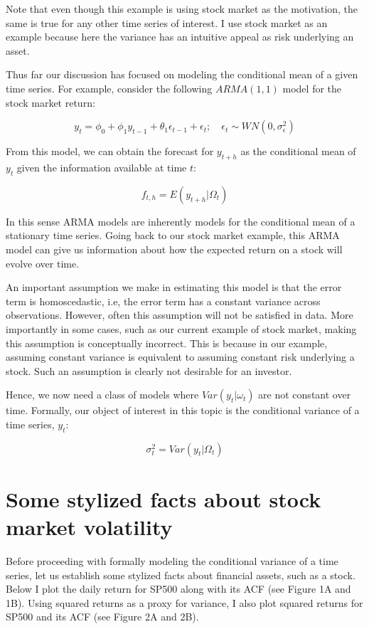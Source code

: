 \documentclass[]{book}
\theoremstyle{definition}
\theoremstyle{definition}
\theoremstyle{definition}
\theoremstyle{remark}
\begin{document}
Note that even though this example is using stock market as the motivation, the same is true for any other time series of interest. I use stock market as an example because here the variance has an intuitive appeal as risk underlying an asset.

Thus far our discussion has focused on modeling the conditional mean of a given time series. For example, consider the following \(ARMA(1,1)\) model for the stock market return:

\[y_t=\phi_0 + \phi_1 y_{t-1} + \theta_1 \epsilon_{t-1} + \epsilon_t ; \quad \epsilon_t\sim WN(0, \sigma^2_\epsilon )\]

From this model, we can obtain the forecast for \(y_{t+h}\) as the conditional mean of \(y_t\) given the information available at time \(t\):

\[f_{t,h}=E(y_{t+h}|\Omega_t)\]

In this sense ARMA models are inherently models for the conditional mean of a stationary time series. Going back to our stock market example, this ARMA model can give us information about how the expected return on a stock will evolve over time.

An important assumption we make in estimating this model is that the error term is homoscedastic, i.e, the error term has a constant variance across observations. However, often this assumption will not be satisfied in data. More importantly in some cases, such as our current example of stock market, making this assumption is conceptually incorrect. This is because in our example, assuming constant variance is equivalent to assuming constant risk underlying a stock. Such an assumption is clearly not desirable for an investor.

Hence, we now need a class of models where \(Var(y_t|\omega_t)\) are not constant over time. Formally, our object of interest in this topic is the conditional variance of a time series, \(y_t\):

\[\sigma_t^2=Var(y_t|\Omega_t)\]

\hypertarget{some-stylized-facts-about-stock-market-volatility}{%
\section{Some stylized facts about stock market volatility}\label{some-stylized-facts-about-stock-market-volatility}}

Before proceeding with formally modeling the conditional variance of a time series, let us establish some stylized facts about financial assets, such as a stock. Below I plot the daily return for SP500 along with its ACF (see Figure 1A and 1B). Using squared returns as a proxy for variance, I also plot squared returns for SP500 and its ACF (see Figure 2A and 2B).
\end{document}
